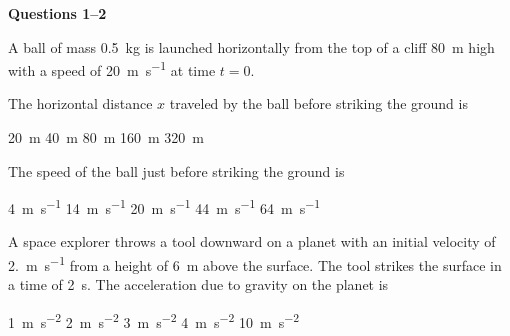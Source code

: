 \documentclass{../../../oss-apphys-exam}
\begin{document}
\genheader


\genmultidirections

\gengravity

\raggedcolumns
\begin{multicols*}{2}

  \textbf{Questions 1--2}
  
  A ball of mass \SI{.5}{\kilo\gram} is launched
  horizontally from the top of a cliff \SI{80}{\metre} high with a speed of
  \SI{20}{\metre\per\second} at time $t=0$.
  
  \begin{center}
  \end{center}
  \begin{questions}
    \question The horizontal distance $x$ traveled by the ball before striking
    the ground is
    \begin{choices}
      \choice\SI{20}{\metre}
      \choice\SI{40}{\metre}
      \choice\SI{80}{\metre} 
      \choice\SI{160}{\metre}
      \choice\SI{320}{\metre}
    \end{choices}
    
    \question The speed of the ball just before striking the ground is
    \begin{choices}
      \choice\SI{4}{\metre\per\second}
      \choice\SI{14}{\metre\per\second}
      \choice\SI{20}{\metre\per\second}
      \choice\SI{44}{\metre\per\second}
      \choice\SI{64}{\metre\per\second}
    \end{choices}

    \question A space explorer throws a tool downward on a planet with an
    initial velocity of \SI{2.}{\metre\per\second} from a height of
    \SI{6}{\metre} above the surface. The tool strikes the surface in a time of
    \SI{2}{\second}. The acceleration due to gravity on the planet is
    \begin{choices}
      \choice\SI{1}{\metre\per\second\squared}
      \choice\SI{2}{\metre\per\second\squared}
      \choice\SI{3}{\metre\per\second\squared}
      \choice\SI{4}{\metre\per\second\squared}
      \choice\SI{10}{\metre\per\second\squared}
    \end{choices}
    \columnbreak
    

\end{questions}
\end{multicols*}
\end{document}
